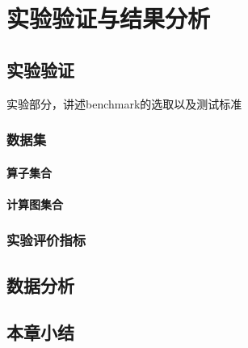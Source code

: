 \chapter{实验验证与结果分析}\label{chap:Result_And_Analysis} 
\section{实验验证}\label{sec:validation}
  实验部分，讲述benchmark的选取以及测试标准
  \subsection{数据集}\label{subsec:dataset}
    \subsubsection{算子集合}\label{subsec:operator_set}
    \subsubsection{计算图集合}\label{subsec:compute_graph_set}
  \subsection{实验评价指标}\label{sec:evaluation_metrics}
\section{数据分析}\label{sec:result_analysis}
\section{本章小结}\label{sec:RAA_summary}

